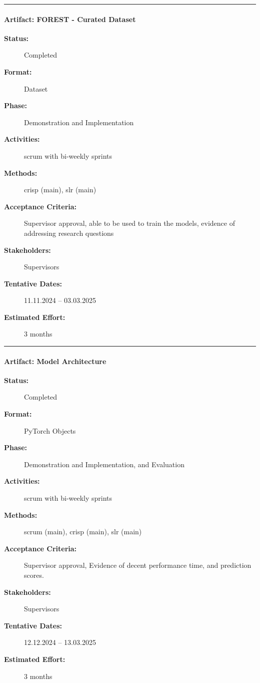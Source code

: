 \noindent\rule{13cm}{0.3pt}

\paragraph{Artifact: FOREST - Curated Dataset}
\begin{description}
  \item[\textbf{Status:}] Completed
  \item[\textbf{Format:}] Dataset
  \item[\textbf{Phase:}] Demonstration and Implementation
  \item[\textbf{Activities:}] \acrshort{scrum} with bi-weekly sprints
  \item[\textbf{Methods:}] \acrshort{crisp} (main), \acrshort{slr} (main)
  \item[\textbf{Acceptance Criteria:}] Supervisor approval, able to be used to train the models, evidence of addressing research questions
  \item[\textbf{Stakeholders:}] Supervisors
  \item[\textbf{Tentative Dates:}] 11.11.2024 – 03.03.2025
  \item[\textbf{Estimated Effort:}] 3 months
\end{description}



\noindent\rule{13cm}{0.3pt}

\paragraph{Artifact: Model Architecture}
\begin{description}
  \item[\textbf{Status:}] Completed
  \item[\textbf{Format:}] PyTorch Objects
  \item[\textbf{Phase:}] Demonstration and Implementation, and Evaluation
  \item[\textbf{Activities:}] \acrshort{scrum} with bi-weekly sprints
  \item[\textbf{Methods:}] \acrshort{scrum} (main), \acrshort{crisp} (main), \acrshort{slr} (main)
  \item[\textbf{Acceptance Criteria:}] Supervisor approval, Evidence of decent performance time, and prediction scores.
  \item[\textbf{Stakeholders:}] Supervisors
  \item[\textbf{Tentative Dates:}] 12.12.2024 – 13.03.2025  
\item[\textbf{Estimated Effort:}] 3 months
\end{description}


